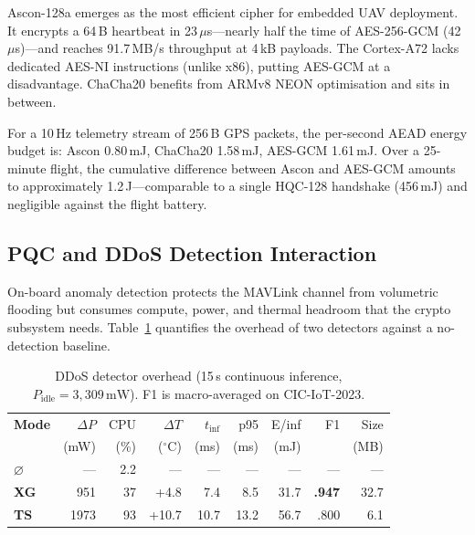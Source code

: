 \documentclass[conference]{IEEEtran}
\newcommand{\mW}{\,\si{\milli\watt}}
\begin{document}
Ascon-128a emerges as the most efficient cipher for embedded UAV
deployment.
It encrypts a 64\,B heartbeat in 23\,$\mu$s---nearly half the time
of AES-256-GCM (42\,$\mu$s)---and reaches 91.7\,MB/s throughput at
4\,kB payloads.  The Cortex-A72 lacks dedicated AES-NI instructions
(unlike x86), putting AES-GCM at a disadvantage.  ChaCha20 benefits
from ARMv8 NEON optimisation and sits in between.

For a 10\,Hz telemetry stream of 256\,B GPS packets, the per-second
AEAD energy budget is:
Ascon 0.80\,mJ, ChaCha20 1.58\,mJ, AES-GCM 1.61\,mJ.
Over a 25-minute flight, the cumulative difference between
Ascon and AES-GCM amounts to approximately 1.2\,J---comparable
to a single HQC-128 handshake (456\,mJ) and negligible against
the flight battery.


\subsection{PQC and DDoS Detection Interaction}
\label{sec:ddos}

On-board anomaly detection protects the MAVLink channel from
volumetric flooding but consumes compute, power, and thermal
headroom that the crypto subsystem needs.  Table~\ref{tab:ddos}
quantifies the overhead of two detectors against a no-detection
baseline.

\begin{table}[t]
\centering
\caption{DDoS detector overhead (15\,s continuous inference,
  $P_\text{idle} = 3{,}309\mW$).  F1 is macro-averaged on
  CIC-IoT-2023.}
\label{tab:ddos}
\footnotesize
\setlength{\tabcolsep}{2.5pt}
\begin{tabular}{@{}l  rr rr rr r r@{}}
\toprule
\textbf{Mode}
  & $\Delta P$ & CPU & $\Delta T$ & $t_\text{inf}$
  & p95 & E/inf & F1 & Size \\
  & (mW) & (\%) & ($^\circ$C) & (ms)
  & (ms) & (mJ) & & (MB) \\
\midrule
$\varnothing$ & --- & 2.2 & --- & --- & --- & --- & --- & --- \\
\textbf{XG} & 951 & 37 & +4.8 & 7.4 & 8.5 & 31.7 & \textbf{.947} & 32.7 \\
\textbf{TS} & \cellcolor{worstcell}1973 & \cellcolor{worstcell}93 & \cellcolor{worstcell}+10.7 & 10.7 & 13.2 & 56.7 & .800 & 6.1 \\
\bottomrule
\end{tabular}
\end{table}
\end{document}
